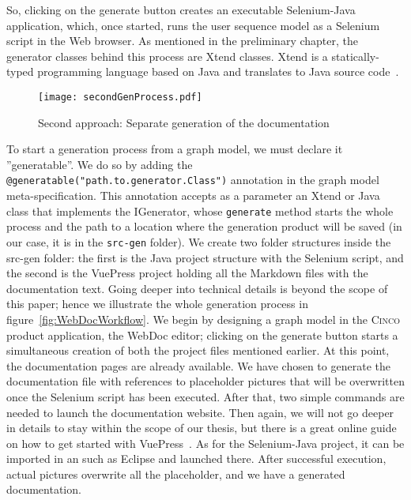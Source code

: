 So, clicking on the generate button creates an executable Selenium-Java application, which, once started, runs the user sequence model as a Selenium script in the Web browser. As mentioned in the preliminary chapter, the generator classes behind this process are Xtend classes. Xtend is a statically-typed programming language based on Java and translates to Java source code~\cite{Xtend}. 

\begin{figure}[h]
    \centering
    \texttt{[image: secondGenProcess.pdf]}
    \caption{Second approach: Separate generation of the documentation}
    \label{fig:secondGenProcess}
\end{figure}

To start a generation process from a graph model, we must declare it ''generatable''. We do so by adding the \lstinline[language=MGL]{@generatable("path.to.generator.Class")} annotation in the graph model meta-specification. This annotation accepts as a parameter an Xtend or Java class that implements the IGenerator, whose \lstinline{generate} method starts the whole process and the path to a location where the generation product will be saved (in our case, it is in the \lstinline{src-gen} folder). We create two folder structures inside the src-gen folder: the first is the Java project structure with the Selenium script, and the second is the VuePress project holding all the Markdown files with the documentation text. Going deeper into technical details is beyond the scope of this paper; hence we illustrate the whole generation process in figure~\ref{fig:WebDocWorkflow}.
We begin by designing a graph model in the \textsc{Cinco} product application, the WebDoc editor; clicking on the generate button starts a simultaneous creation of both the project files mentioned earlier. At this point, the documentation pages are already available. We have chosen to generate the documentation file with references to placeholder pictures that will be overwritten once the Selenium script has been executed. After that, two simple commands are needed to launch the documentation website. Then again, we will not go deeper in details to stay within the scope of our thesis, but there is a great online guide on how to get started with VuePress~\cite{vuepress}. As for the Selenium-Java project, it can be imported in an  such as Eclipse and launched there. After successful execution, actual pictures overwrite all the placeholder, and we have a generated documentation.
